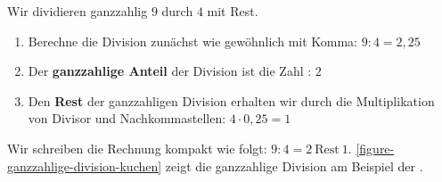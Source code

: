 \begin{example}
Wir dividieren ganzzahlig $9$ durch $4$ mit Rest.

\begin{enumerate}
\item Berechne die Division zunächst wie gewöhnlich mit Komma: $9 : 4 = 2,25$
\item Der \textbf{ganzzahlige Anteil} der Division ist die Zahl : $2$
\item Den \textbf{Rest} der ganzzahligen Division erhalten wir durch die Multiplikation von Divisor und Nachkommastellen: $4 \cdot 0,25 = 1$
\end{enumerate}

Wir schreiben die Rechnung kompakt wie folgt: $9 : 4 = 2~\text{Rest}~1$. \autoref{figure-ganzzahlige-division-kuchen} zeigt die ganzzahlige Division am Beispiel der .


\end{example}
